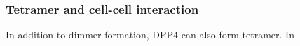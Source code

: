 \subsubsection{Tetramer and cell-cell interaction}

In addition to dimmer formation, DPP4 can also form tetramer. In 